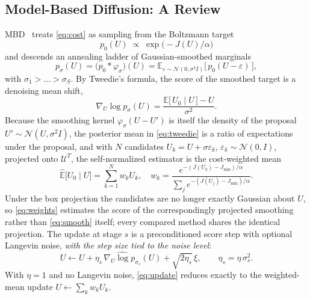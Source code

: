 \documentclass[lettersize,journal]{IEEEtran}
\theoremstyle{remark}
\begin{document}
\subsection{Model-Based Diffusion: A Review}\label{subsec:mbd}

MBD~\cite{pan2024model} treats \eqref{eq:cost} as sampling from the
Boltzmann target
\begin{equation}
p_0(U) \;\propto\; \exp\!\big(-J(U)/\alpha\big)
\label{eq:target}
\end{equation}
and descends an annealing ladder of Gaussian-smoothed marginals
\begin{equation}
p_{\sigma}(U) = \big(p_0 * \varphi_{\sigma}\big)(U)
= \mathbb{E}_{\varepsilon \sim \mathcal{N}(0, \sigma^{2} I)}
\big[\, p_0(U - \varepsilon) \,\big],
\label{eq:smooth}
\end{equation}
with $\sigma_1 > \dots > \sigma_S$. By Tweedie's formula, the score of the
smoothed target is a denoising mean shift,
\begin{equation}
\nabla_U \log p_{\sigma}(U)
= \frac{\mathbb{E}\big[\,U_0 \mid U\,\big] - U}{\sigma^{2}} .
\label{eq:tweedie}
\end{equation}
Because the smoothing kernel $\varphi_\sigma(U - U')$ is itself the density
of the proposal $U' \sim \mathcal{N}(U, \sigma^{2} I)$, the posterior mean
in \eqref{eq:tweedie} is a ratio of expectations under the proposal, and
with $N$ candidates $U_k = U + \sigma \varepsilon_k$,
$\varepsilon_k \sim \mathcal{N}(0, I)$, projected onto $\mathcal{U}^{T}$,
the self-normalized estimator is the cost-weighted mean
\begin{equation}
\widehat{\mathbb{E}}\big[U_0 \mid U\big] = \sum_{k=1}^{N} w_k U_k,
\quad
w_k = \frac{e^{-(J(U_k) - J_{\min})/\alpha}}
           {\sum_{j} e^{-(J(U_j) - J_{\min})/\alpha}} .
\label{eq:weights}
\end{equation}
Under the box projection the candidates are no longer exactly Gaussian
about $U$, so \eqref{eq:weights} estimates the score of the
correspondingly projected smoothing rather than \eqref{eq:smooth} itself;
every compared method shares the identical projection.
The update at stage $s$ is a preconditioned score step with optional
Langevin noise, \emph{with the step size tied to the noise level}:
\begin{equation}
U \leftarrow U + \eta_s\, \widehat{\nabla_U \log p_{\sigma_s}}(U)
+ \sqrt{2 \eta_s}\, \xi,
\qquad
\eta_s = \eta\, \sigma_s^{2} .
\label{eq:update}
\end{equation}
With $\eta = 1$ and no Langevin noise, \eqref{eq:update} reduces exactly to
the weighted-mean update $U \leftarrow \sum_k w_k U_k$.
\end{document}

